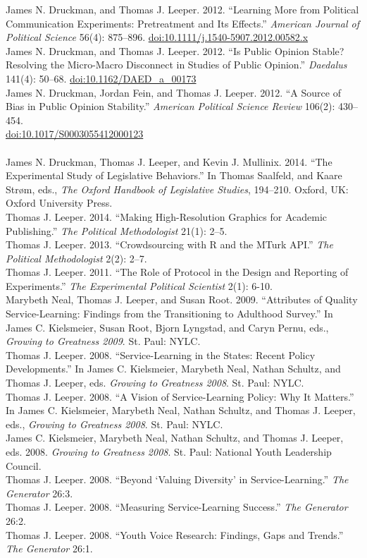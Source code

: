 \documentclass[12pt]{article}
\newcommand{\topic}[1]{\pagebreak[3]\indent {\color{lg}{\footnotesize #1 }}\\}
\newcommand{\entry}[1]{\indent {\color{lg}\guillemotright}\hspace{2pt}#1\vspace{.25em}\\}
\begin{document}
\entry{James N. Druckman, and Thomas J. Leeper. 2012. ``Learning More from Political Communication Experiments: Pretreatment and Its Effects.'' {\em American Journal of Political Science} 56(4): 875--896. \href{http://dx.doi.org/10.1111/j.1540-5907.2012.00582.x}{doi:10.1111/j.1540-5907.2012.00582.x}}
\entry{James N. Druckman, and Thomas J. Leeper. 2012. ``Is Public Opinion Stable? Resolving the Micro-Macro Disconnect in Studies of Public Opinion.'' {\em Daedalus} 141(4): 50--68. \href{http://dx.doi.org/10.1162/DAED\_a\_00173}{doi:10.1162/DAED\_a\_00173}}
\entry{James N. Druckman, Jordan Fein, and Thomas J. Leeper. 2012. ``A Source of Bias in Public Opinion Stability.'' {\em American Political Science Review} 106(2): 430--454.\\ \href{http://dx.doi.org/10.1017/S0003055412000123}{doi:10.1017/S0003055412000123}}

\topic{Other Publications}
\entry{James N. Druckman, Thomas J. Leeper, and Kevin J. Mullinix. 2014. ``The Experimental Study of Legislative Behaviors.'' In Thomas Saalfeld, and Kaare Str\o m, eds., {\em The Oxford Handbook of Legislative Studies}, 194--210. Oxford, UK: Oxford University Press.}
\entry{Thomas J. Leeper. 2014. ``Making High-Resolution Graphics for Academic Publishing.'' {\em The Political Methodologist} 21(1): 2--5.}
\entry{Thomas J. Leeper. 2013. ``Crowdsourcing with R and the MTurk API.'' {\em The Political Methodologist} 2(2): 2--7.}
\entry{Thomas J. Leeper. 2011. ``The Role of Protocol in the Design and Reporting of Experiments.'' {\em The Experimental Political Scientist} 2(1): 6-10.}%
\entry{Marybeth Neal, Thomas J. Leeper, and Susan Root. 2009. ``Attributes of Quality Service-Learning: Findings from the Transitioning to Adulthood Survey.'' In James C. Kielsmeier, Susan Root, Bjorn Lyngstad, and Caryn Pernu, eds., {\em Growing to Greatness 2009}. St. Paul: NYLC.}
\entry{Thomas J. Leeper. 2008. ``Service-Learning in the States: Recent Policy Developments.'' In James C. Kielsmeier, Marybeth Neal, Nathan Schultz, and Thomas J. Leeper, eds. {\em Growing to Greatness 2008}. St. Paul: NYLC.}
\entry{Thomas J. Leeper. 2008. ``A Vision of Service-Learning Policy: Why It Matters.'' In James C. Kielsmeier, Marybeth Neal, Nathan Schultz, and Thomas J. Leeper, eds., {\em Growing to Greatness 2008}. St. Paul: NYLC.}
\entry{James C. Kielsmeier, Marybeth Neal, Nathan Schultz, and Thomas J. Leeper, eds. 2008. {\em Growing to Greatness 2008}. St. Paul: National Youth Leadership Council.}
\entry{Thomas J. Leeper. 2008. ``Beyond `Valuing Diversity' in Service-Learning.'' {\em The Generator} 26:3.}
\entry{Thomas J. Leeper. 2008. ``Measuring Service-Learning Success.'' {\em The Generator} 26:2.}
\entry{Thomas J. Leeper. 2008. ``Youth Voice Research: Findings, Gaps and Trends.'' {\em The Generator} 26:1.}
\end{document}
